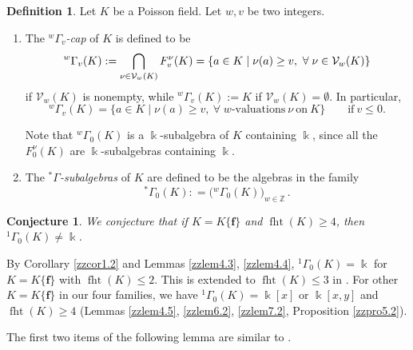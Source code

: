 \documentclass[12pt]{amsart}
\theoremstyle{plain}
\newtheorem{conjecture}[theorem]{Conjecture}
\numberwithin{theorem}{section}
\numberwithin{equation}{theorem}
\theoremstyle{definition}
\newtheorem{definition}[theorem]{Definition}
\newcommand{\ZZ}{\mathbb{Z}}
\DeclareMathOperator{\fht}{fht}
\newcommand \bff {{\mathbf{f}}}
\newcommand \calV {{\mathcal{V}}}
\begin{document}
\begin{definition}
\label{zzdef3.5}
Let $K$ be a Poisson field. Let $w,v$ be two integers.
\begin{enumerate}
\item[(1)]
The {\it $^{w}\Gamma_{v}$-cap} of $K$ is defined to be
\begin{equation}
\notag
{^{w}\Gamma_{v}}(K) :=\bigcap_{\nu \in {\mathcal V}_w(K)} F^{\nu}_v(K) = \{a\in K\mid \nu(a)\geq v, \
\forall \; \nu\in {\mathcal V}_{w}(K)\}
\end{equation}
if $\calV_w(K)$ is nonempty, while ${^{w}\Gamma_{v}}(K) := K$ if $\calV_w(K) = \emptyset$.  In particular, 
$$
{^{w}\Gamma_{v}}(K) = \{a\in K\mid \nu(a)\geq v, \
\forall \; w\text{-valuations}\ \nu\ \text{on}\ K \} \qquad \text{if}\ v \le 0.
$$

Note that ${^{w}\Gamma_{0}}(K)$ is a $\Bbbk$-subalgebra of $K$ 
containing $\Bbbk$, since all the $F^\nu_0(K)$ are 
$\Bbbk$-subalgebras containing $\Bbbk$.
\item[(2)]
The \emph{${^{\ast}\Gamma}$-subalgebras} of $K$ are defined 
to be the algebras in the family
$${{^\ast}\Gamma_{0}}(K):
=\bigl( {^{w}\Gamma_{0}}(K) \bigr)_{w\in {\ZZ}} \,.$$
\end{enumerate} 
\end{definition}


\begin{conjecture}  
\label{zzcon3.6}
We conjecture that if $K = K\{\bff\}$ and $\fht(K)\geq 4$, then 
${^1\Gamma}_0(K)\neq \Bbbk$.
\end{conjecture}

By Corollary \ref{zzcor1.2} and Lemmas \ref{zzlem4.3}, \ref{zzlem4.4}, 
${^1\Gamma}_0(K) = \Bbbk$ for 
$K = K\{\bff\}$ with $\fht(K) \le 2$. 
This is extended to $\fht(K) \le 3$ 
in \cite{GZ2}.  For other $K = 
K\{\bff\}$ in our four families, we 
have ${^1\Gamma}_0(K) = \Bbbk[x]$ 
or $\Bbbk[x,y]$ and $\fht(K) \ge 4$ 
(Lemmas \ref{zzlem4.5}, 
\ref{zzlem6.2}, \ref{zzlem7.2}, 
Proposition \ref{zzpro5.2}). 

The first two items of the following lemma are similar to \cite[Lemma 4.2]{HTWZ1}.
 
\end{document}
